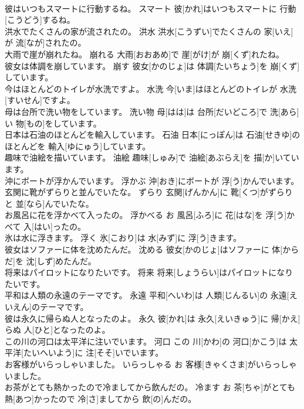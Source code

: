 \documentclass[8pt]{extreport}
\begin{document}
\begin{CJK}{UTF8}{min}
\\	彼はいつもスマートに行動するね。	スマート	彼[かれ]はいつもスマートに 行動[こうどう]するね。	
\\	洪水でたくさんの家が流されたの。	洪水	洪水[こうずい]でたくさんの 家[いえ]が 流[なが]されたの。	
\\	大雨で崖が崩れたね。	崩れる	大雨[おおあめ]で 崖[がけ]が 崩[くず]れたね。	
\\	彼女は体調を崩しています。	崩す	彼女[かのじょ]は 体調[たいちょう]を 崩[くず]しています。	
\\	今はほとんどのトイレが水洗ですよ。	水洗	今[いま]はほとんどのトイレが 水洗[すいせん]ですよ。	
\\	母は台所で洗い物をしています。	洗い物	母[はは]は 台所[だいどころ]で 洗[あら]い 物[もの]をしています。	
\\	日本は石油のほとんどを輸入しています。	石油	日本[にっぽん]は 石油[せきゆ]のほとんどを 輸入[ゆにゅう]しています。	
\\	趣味で油絵を描いています。	油絵	趣味[しゅみ]で 油絵[あぶらえ]を 描[か]いています。	
\\	沖にボートが浮かんでいます。	浮かぶ	沖[おき]にボートが 浮[う]かんでいます。	
\\	玄関に靴がずらりと並んでいたな。	ずらり	玄関[げんかん]に 靴[くつ]がずらりと 並[なら]んでいたな。	
\\	お風呂に花を浮かべて入ったの。	浮かべる	お 風呂[ふろ]に 花[はな]を 浮[う]かべて 入[はい]ったの。	
\\	氷は水に浮きます。	浮く	氷[こおり]は 水[みず]に 浮[う]きます。	
\\	彼女はソファーに体を沈めたんだ。	沈める	彼女[かのじょ]はソファーに 体[からだ]を 沈[しず]めたんだ。	
\\	将来はパイロットになりたいです。	将来	将来[しょうらい]はパイロットになりたいです。	
\\	平和は人類の永遠のテーマです。	永遠	平和[へいわ]は 人類[じんるい]の 永遠[えいえん]のテーマです。	
\\	彼は永久に帰らぬ人となったのよ。	永久	彼[かれ]は 永久[えいきゅう]に 帰[かえ]らぬ 人[ひと]となったのよ。	
\\	この川の河口は太平洋に注いでいます。	河口	この 川[かわ]の 河口[かこう]は 太平洋[たいへいよう]に 注[そそ]いでいます。	
\\	お客様がいらっしゃいました。	いらっしゃる	お 客様[きゃくさま]がいらっしゃいました。	
\\	お茶がとても熱かったので冷ましてから飲んだの。	冷ます	お 茶[ちゃ]がとても 熱[あつ]かったので 冷[さ]ましてから 飲[の]んだの。	

\end{CJK}
\end{document}
